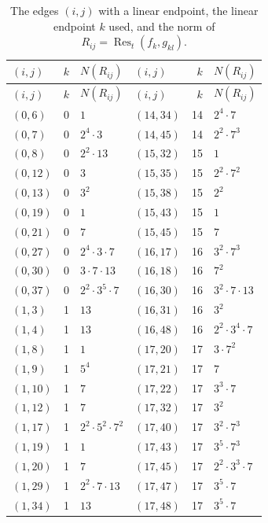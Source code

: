 \documentclass[11pt]{article}
\begin{document}
\begingroup\small
\setlength{\LTcapwidth}{\textwidth}
\begin{longtable}{@{}lrl@{\qquad}lrl@{}}
\caption{The edges $(i,j)$ with a linear endpoint, the linear endpoint $k$ used, and the norm of $R_{ij}=\operatorname{Res}_t(f_k,g_{kl})$.}\label{tab:sep}\\
\hline $(i,j)$ & $k$ & $N(R_{ij})$ & $(i,j)$ & $k$ & $N(R_{ij})$\\\hline\endfirsthead\hline $(i,j)$ & $k$ & $N(R_{ij})$ & $(i,j)$ & $k$ & $N(R_{ij})$\\\hline\endhead\hline\endfoot
$(0,6)$ & 0 & $1$ & $(14,34)$ & 14 & $2^{4}\cdot 7$\\
$(0,7)$ & 0 & $2^{4}\cdot 3$ & $(14,45)$ & 14 & $2^{2}\cdot 7^{3}$\\
$(0,8)$ & 0 & $2^{2}\cdot 13$ & $(15,32)$ & 15 & $1$\\
$(0,12)$ & 0 & $3$ & $(15,35)$ & 15 & $2^{2}\cdot 7^{2}$\\
$(0,13)$ & 0 & $3^{2}$ & $(15,38)$ & 15 & $2^{2}$\\
$(0,19)$ & 0 & $1$ & $(15,43)$ & 15 & $1$\\
$(0,21)$ & 0 & $7$ & $(15,45)$ & 15 & $7$\\
$(0,27)$ & 0 & $2^{4}\cdot 3\cdot 7$ & $(16,17)$ & 16 & $3^{2}\cdot 7^{3}$\\
$(0,30)$ & 0 & $3\cdot 7\cdot 13$ & $(16,18)$ & 16 & $7^{2}$\\
$(0,37)$ & 0 & $2^{2}\cdot 3^{5}\cdot 7$ & $(16,30)$ & 16 & $3^{2}\cdot 7\cdot 13$\\
$(1,3)$ & 1 & $13$ & $(16,31)$ & 16 & $3^{2}$\\
$(1,4)$ & 1 & $13$ & $(16,48)$ & 16 & $2^{2}\cdot 3^{4}\cdot 7$\\
$(1,8)$ & 1 & $1$ & $(17,20)$ & 17 & $3\cdot 7^{2}$\\
$(1,9)$ & 1 & $5^{4}$ & $(17,21)$ & 17 & $7$\\
$(1,10)$ & 1 & $7$ & $(17,22)$ & 17 & $3^{3}\cdot 7$\\
$(1,12)$ & 1 & $7$ & $(17,32)$ & 17 & $3^{2}$\\
$(1,17)$ & 1 & $2^{2}\cdot 5^{2}\cdot 7^{2}$ & $(17,40)$ & 17 & $3^{2}\cdot 7^{3}$\\
$(1,19)$ & 1 & $1$ & $(17,43)$ & 17 & $3^{5}\cdot 7^{3}$\\
$(1,20)$ & 1 & $7$ & $(17,45)$ & 17 & $2^{2}\cdot 3^{3}\cdot 7$\\
$(1,29)$ & 1 & $2^{2}\cdot 7\cdot 13$ & $(17,47)$ & 17 & $3^{5}\cdot 7$\\
$(1,34)$ & 1 & $13$ & $(17,48)$ & 17 & $3^{5}\cdot 7$\\

\end{longtable}
\end{document}
